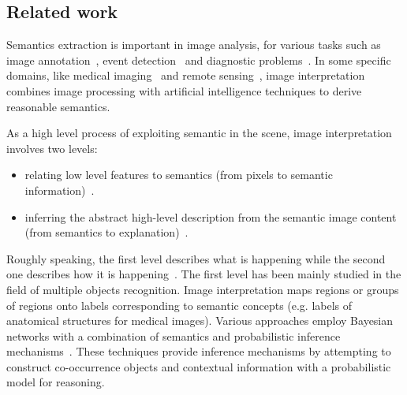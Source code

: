 \documentclass{article}
\begin{document}
 \subsection{Related work}
Semantics extraction is important in image analysis, for various tasks such as image annotation~\cite{tousch2012semantic}, event detection~\cite{lavee2009understanding} and 
diagnostic problems~\cite{atif2014explanatory,atif2007grafip}.
In some specific domains, like medical imaging~\cite{atif2014explanatory,Bloch2005fuzzy,fouquier2012sequential,nempont2013constraint} and
remote sensing~\cite{forestier2012knowledge,vanegas2010detection}, image interpretation combines image processing with artificial intelligence techniques to derive reasonable semantics.  

As a high level process of exploiting semantic in the scene, image interpretation involves two levels:
\begin{itemize}
 \item relating low level features to semantics (from pixels to semantic information)~\cite{Bloch2005fuzzy,fouquier2012sequential,Hudelot2008fuzzy,nempont2013constraint}.
 \item inferring the abstract high-level description from the semantic image content (from semantics to explanation)~\cite{atif2014explanatory,Espinosa07multimedia}.
\end{itemize}

Roughly speaking, the first level describes what is happening while the second one describes how it is happening~\cite{tsotsos1992image}.
The first level has been mainly studied in the field of multiple objects recognition. 
Image interpretation maps regions or groups of regions onto labels corresponding to semantic concepts (e.g. labels of anatomical structures for medical images).
Various approaches employ Bayesian networks with a combination of semantics and probabilistic inference mechanisms~\cite{Luo2005Bayesian,Niko2009evidence,Singhal2003proba}.
These techniques provide inference mechanisms by attempting to construct co-occurrence objects and contextual information with a probabilistic model for reasoning.
\end{document}
